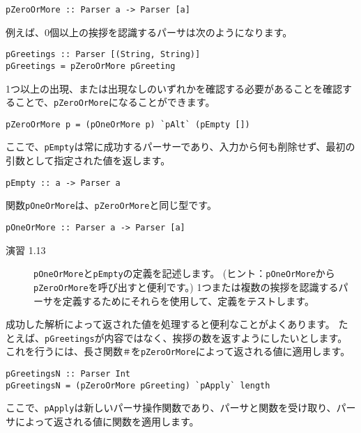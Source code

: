 \documentclass{jarticle}
\begin{document}
\begin{verbatim}
pZeroOrMore :: Parser a -> Parser [a]
\end{verbatim}

例えば、0個以上の挨拶を認識するパーサは次のようになります。

\begin{verbatim}
pGreetings :: Parser [(String, String)]
pGreetings = pZeroOrMore pGreeting
\end{verbatim}

1つ以上の出現、または出現なしのいずれかを確認する必要があることを確認することで、\texttt{pZeroOrMore}になることができます。

\begin{verbatim}
pZeroOrMore p = (pOneOrMore p) `pAlt` (pEmpty [])
\end{verbatim}

ここで、\texttt{pEmpty}は常に成功するパーサーであり、入力から何も削除せず、最初の引数として指定された値を返します。

\begin{verbatim}
pEmpty :: a -> Parser a
\end{verbatim}

関数\texttt{pOneOrMore}は、\texttt{pZeroOrMore}と同じ型です。

\begin{verbatim}
pOneOrMore :: Parser a -> Parser [a]
\end{verbatim}

\begin{description}
	\item[演習 1.13] \texttt{pOneOrMore}と\texttt{pEmpty}の定義を記述します。
	      (ヒント：\texttt{pOneOrMore}から\texttt{pZeroOrMore}を呼び出すと便利です。)
	      1つまたは複数の挨拶を認識するパーサを定義するためにそれらを使用して、定義をテストします。
\end{description}

成功した解析によって返された値を処理すると便利なことがよくあります。
たとえば、\texttt{pGreetings}が内容ではなく、挨拶の数を返すようにしたいとします。
これを行うには、長さ関数\texttt{＃}を\texttt{pZeroOrMore}によって返される値に適用します。

\begin{verbatim}
pGreetingsN :: Parser Int
pGreetingsN = (pZeroOrMore pGreeting) `pApply` length
\end{verbatim}

ここで、\texttt{pApply}は新しいパーサ操作関数であり、パーサと関数を受け取り、パーサによって返される値に関数を適用します。
\end{document}
